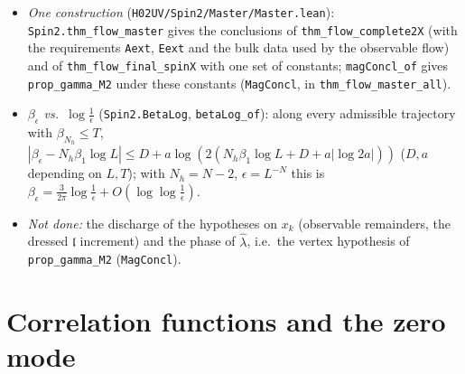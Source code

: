 \documentclass[11pt]{amsart}
\theoremstyle{definition}
\theoremstyle{remark}
\numberwithin{equation}{section}
\begin{document}
\begin{itemize}
\item \emph{One construction} (\texttt{H02UV/Spin2/Master/Master.lean}): \texttt{Spin2.thm\_flow\_master} gives the conclusions of
  \texttt{thm\_flow\_complete2X} (with the requirements \texttt{Aext}, \texttt{Eext} and the bulk data used by the observable flow)
  and of \texttt{thm\_flow\_final\_spinX} with one set of constants; \texttt{magConcl\_of} gives \texttt{prop\_gamma\_M2} under
  these constants (\texttt{MagConcl}, in \texttt{thm\_flow\_master\_all}).
\item \emph{$\beta_\epsilon$ vs.\ $\log\frac1\epsilon$} (\texttt{Spin2.BetaLog}, \texttt{betaLog\_of}): along every admissible trajectory
  with $\beta_{N_h}\le T$, $|\beta_\epsilon-N_h\beta_1\log L|\le D+a\log(2(N_h\beta_1\log L+D+a|\log2a|))$ ($D,a$ depending on
  $L,T$); with $N_h=N-2$, $\epsilon=L^{-N}$ this is $\beta_\epsilon=\frac3{2\pi}\log\frac1\epsilon+O(\log\log\frac1\epsilon)$.
\item \emph{Not done:} the discharge of the hypotheses on $x_k$ (observable remainders, the dressed
  $\mathfrak l$ increment) and the phase of $\hat\lambda$, i.e.\ the vertex hypothesis of \texttt{prop\_gamma\_M2}
  (\texttt{MagConcl}).
\end{itemize}

\section{Correlation functions and the zero mode}
\label{sec:corr}
\end{document}
